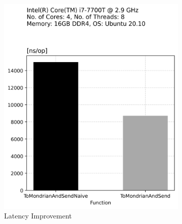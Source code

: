 \begin{figure}[t]
    \centering
    \begin{subfigure}[t]{.22\textwidth}
      \centering
      \includegraphics[width=\linewidth]{img/to_mondrian_and_send_opt_time.png}
      \caption{Latency Improvement}
      \label{fig:sub: Latency Improvement}
    \end{subfigure}\hfill%
    \begin{subfigure}[t]{.22\textwidth}
      \centering

\end{subfigure}
\end{figure}
